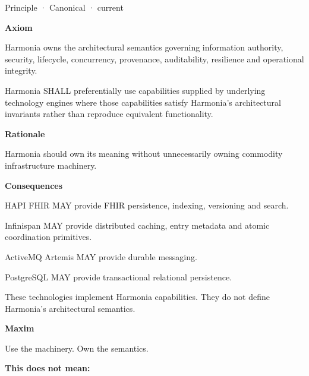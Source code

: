 \label{element:54508cda80484a6caf95b901780eaf7d}
{\small Principle · Canonical · current}\par

\par\medskip\textbf{Axiom}\par


Harmonia owns the architectural semantics governing information
authority, security, lifecycle, concurrency, provenance, auditability,
resilience and operational integrity.



Harmonia SHALL preferentially use capabilities supplied by underlying
technology engines where those capabilities satisfy Harmonia's
architectural invariants rather than reproduce equivalent functionality.



\par\medskip\textbf{Rationale}\par


Harmonia should own its meaning without unnecessarily owning commodity
infrastructure machinery.



\par\medskip\textbf{Consequences}\par


HAPI FHIR MAY provide FHIR persistence, indexing, versioning and search.



Infinispan MAY provide distributed caching, entry metadata and atomic
coordination primitives.



ActiveMQ Artemis MAY provide durable messaging.



PostgreSQL MAY provide transactional relational persistence.



These technologies implement Harmonia capabilities. They do not define
Harmonia's architectural semantics.



\par\medskip\textbf{Maxim}\par


Use the machinery. Own the semantics.



\textbf{This does not mean:}



